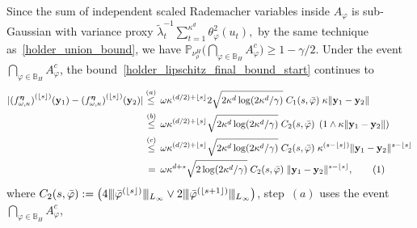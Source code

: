 \documentclass[twoside,11pt]{article}
\newcommand\numberthis{\addtocounter{equation}{1}\tag{\theequation}}
\newcommand{\floor}[1]{\lfloor #1 \rfloor} %
\newcommand{\vectorize}[1]{\mathbf{#1}}
\newcommand{\mP}{\mathbb{P}} %
\newcommand{\dimDensity}{d} %
\newcommand{\smoothness}{s}
\newcommand{\ONset}{\mathbb{B}}
\newcommand{\binNum}{\kappa}           %
\newcommand{\coef}{\theta}
\begin{document}
\begin{appendix}
	Since the sum of independent scaled Rademacher variables inside $A_{\varphi}$ is sub-Gaussian with variance proxy
	$
	\tilde{\lambda}_t^{-1} \sum_{t=1}^{\binNum^\dimDensity} \coef_\varphi^2(u_t),
	$
	by the same technique as~\eqref{holder_union_bound}, we have $\mP_{\nu_\rho^H}
	\bigl(
	\bigcap_{\varphi \in \ONset_H} A_\varphi^c
	\bigr) \geq 1-\gamma/2$.
	Under the event $\bigcap_{\varphi \in \ONset_H} A_\varphi^c$,
	the bound~\eqref{holder_lipschitz_final_bound_start} continues to
	\begin{align*}
		|
		{(f^{{\boldsymbol{\eta}}}_{\omega, \binNum})}^{ (\floor{s})}(\vectorize{y}_1)
		-
		{(f^{{\boldsymbol{\eta}}}_{\omega, \binNum})}^{ (\floor{s})}(\vectorize{y}_2)
		|
		\stackrel{(a)}{\leq} \hskip 1.57mm &
		\omega
		\kappa^{(\dimDensity/2) + \floor{s}}
		2 \sqrt{2\binNum^{\dimDensity} \log(2{\binNum^{\dimDensity}}/\gamma)}
		\; C_1(\smoothness, \bar{\varphi})\;
		\kappa
		\|\vectorize{y}_1-\vectorize{y}_2\|
		\\ \stackrel{(b)}{\leq} \hskip 1.57mm &
		\omega
		\kappa^{(\dimDensity/2) + \floor{s}}
		\sqrt{2\binNum^{\dimDensity} \log(2{\binNum^{\dimDensity}}/\gamma)}
		\; C_2(\smoothness, \bar{\varphi}) \;
		\left(
		1
		\wedge
		\kappa
		\|\vectorize{y}_1-\vectorize{y}_2\|
		\right)
		\\ \stackrel{(c)}{\leq} \hskip 1.57mm &
		\omega
		\kappa^{(\dimDensity/2) + \floor{s}}
		\sqrt{2\binNum^{\dimDensity} \log(2{\binNum^{\dimDensity}}/\gamma)}
		\; C_2(s, \bar{\varphi}) \;
		\binNum^{(s-\floor{s})} \|\vectorize{y}_1 - \vectorize{y}_2\|^{s-\floor{s}}
		\\ = \hskip 1.73mm&
		\omega
		\kappa^{\dimDensity + s}
		\sqrt{2 \log(2{\binNum^{\dimDensity}}/\gamma)}
		\; C_2(s, \bar{\varphi}) \;
		\|\vectorize{y}_1 - \vectorize{y}_2\|^{s-\floor{s}},
		\numberthis \label{eq:two_sample_lower_bound_Holder_basic_ineqs}
	\end{align*}
	where $C_2(\smoothness, \bar{\varphi}) := 
	\bigl(
	4
	\vert\kern-0.25ex
	\vert\kern-0.25ex
	\vert
	\bar{\varphi}^{(\floor{s})}
	\vert\kern-0.25ex
	\vert\kern-0.25ex
	\vert_{L_\infty}
	\vee
	2\vert\kern-0.25ex
	\vert\kern-0.25ex
	\vert
	\bar{\varphi}^{(\floor{s+1})}
	\vert\kern-0.25ex
	\vert\kern-0.25ex
	\vert_{L_\infty}
	\bigr)$,
	step~$(a)$ uses the event $\bigcap_{\varphi \in \ONset_H} A_\varphi^c$, 

\end{appendix}
\end{document}
